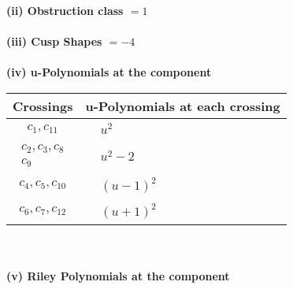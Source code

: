 \documentclass[1p]{elsarticle_modified}
\theoremstyle{definition}
\begin{document}
\flushleft \textbf{(ii) Obstruction class $= 1$}\\~\\
\flushleft \textbf{(iii) Cusp Shapes $= -4$}\\~\\
\newpage\renewcommand{\arraystretch}{1}
\flushleft \textbf{(iv) u-Polynomials at the component}\newline \\
\begin{tabular}{m{50pt}|m{274pt}}
Crossings & \hspace{64pt}u-Polynomials at each crossing \\
\hline $$\begin{aligned}c_{1},c_{11}\end{aligned}$$&$\begin{aligned}
&u^2
\end{aligned}$\\
\hline $$\begin{aligned}c_{2},c_{3},c_{8}\\c_{9}\end{aligned}$$&$\begin{aligned}
&u^2-2
\end{aligned}$\\
\hline $$\begin{aligned}c_{4},c_{5},c_{10}\end{aligned}$$&$\begin{aligned}
&(u-1)^2
\end{aligned}$\\
\hline $$\begin{aligned}c_{6},c_{7},c_{12}\end{aligned}$$&$\begin{aligned}
&(u+1)^2
\end{aligned}$\\
\hline
\end{tabular}\\~\\
\newpage\renewcommand{\arraystretch}{1}
\flushleft \textbf{(v) Riley Polynomials at the component}\newline \\
\end{document}
